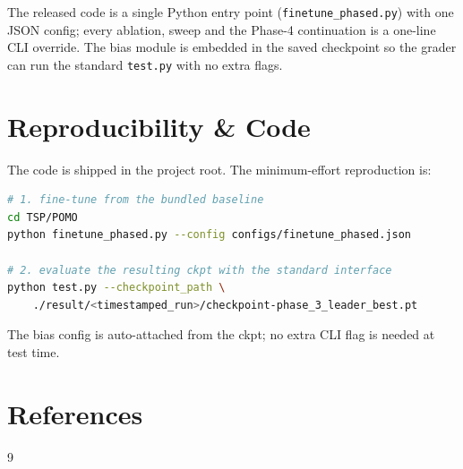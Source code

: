 \documentclass[11pt,a4paper]{article}
\begin{document}
The released code is a single Python entry point
(\texttt{finetune\_phased.py}) with one JSON config; every ablation, sweep
and the Phase-4 continuation is a one-line CLI override. The bias module
is embedded in the saved checkpoint so the grader can run the standard
\texttt{test.py} with no extra flags.

\section*{Reproducibility \& Code}

The code is shipped in the project root. The minimum-effort reproduction
is:
\begin{lstlisting}[language=bash]
# 1. fine-tune from the bundled baseline
cd TSP/POMO
python finetune_phased.py --config configs/finetune_phased.json

# 2. evaluate the resulting ckpt with the standard interface
python test.py --checkpoint_path \
    ./result/<timestamped_run>/checkpoint-phase_3_leader_best.pt
\end{lstlisting}

The bias config is auto-attached from the ckpt; no extra CLI flag is
needed at test time.

\section*{References}
\begin{thebibliography}{9}
\bibitem{AM} %
\end{thebibliography}
\end{document}
